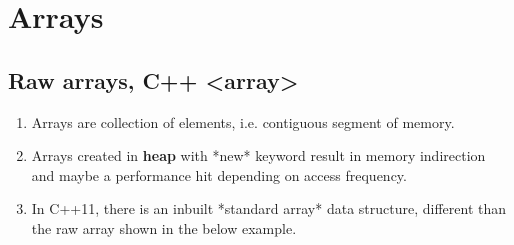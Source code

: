 \documentclass{article}
\begin{document}
        
\section{Arrays}
    \subsection{Raw arrays, C++ <array>}
        \begin{enumerate}
            \item Arrays are collection of elements, i.e. contiguous segment of memory.
            
            \item Arrays created in \textbf{heap}  with *new* keyword result in memory indirection and maybe a performance hit depending on access frequency.
            
            \item In C++11, there is an inbuilt *standard array* data structure, different than the raw array shown in the below example. 
                
        \end{enumerate}
\end{document}
